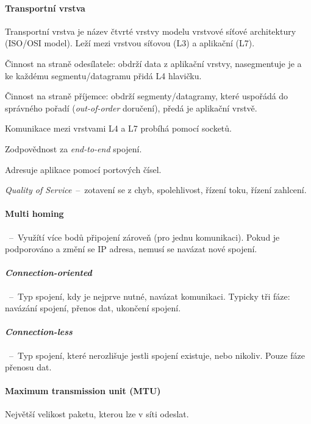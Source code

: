 \paragraph*{Transportní vrstva} Transportní vrstva je název čtvrté vrstvy modelu vrstvové síťové architektury (ISO/OSI model). Leží mezi vrstvou síťovou (L3) a aplikační (L7). \begin{compactitem}
    \item Činnost na straně odesílatele: obdrží data z aplikační vrstvy, nasegmentuje je a ke každému segmentu/datagramu přidá L4 hlavičku.
    \item Činnost na straně příjemce: obdrží segmenty/datagramy, které uspořádá do správného pořadí (\textit{out-of-order} doručení), předá je aplikační vrstvě.
    \item Komunikace mezi vrstvami L4 a L7 probíhá pomocí socketů.
    \item Zodpovědnost za \textit{end-to-end} spojení.
    \item Adresuje aplikace pomocí portových čísel.
    \item \textit{Quality of Service}~--~zotavení se z chyb, spolehlivost, řízení toku, řízení zahlcení.
\end{compactitem}

\paragraph*{Multi homing}~--~Využítí více bodů připojení zároveň (pro jednu komunikaci). Pokud je podporováno a změní se IP adresa, nemusí se navázat nové spojení.

\paragraph*{\textit{Connection-oriented}}~--~Typ spojení, kdy je nejprve nutné, navázat komunikaci. Typicky tři fáze: navázání spojení, přenos dat, ukončení spojení.

\paragraph*{\textit{Connection-less}}~--~Typ spojení, které nerozlišuje jestli spojení existuje, nebo nikoliv. Pouze fáze přenosu dat.

\paragraph*{Maximum transmission unit (MTU)} Největší velikost paketu, kterou lze v síti odeslat.

